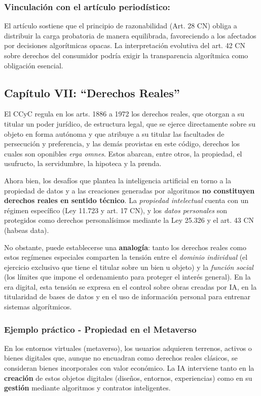 \documentclass[10pt, a4paper]{article}
\begin{document}
\subsubsection*{Vinculación con el artículo periodístico:}
El artículo sostiene que el principio de razonabilidad (Art. 28 CN) obliga a distribuir la carga probatoria de manera equilibrada, favoreciendo a los afectados por decisiones algorítmicas opacas. La interpretación evolutiva del art. 42 CN sobre derechos del consumidor podría exigir la transparencia algorítmica como obligación esencial.

\subsection*{Capítulo VII: ``Derechos Reales''}
\label{subsec:derechos_reales}

El CCyC regula en los arts. 1886 a 1972 los derechos reales, que otorgan a su titular un poder jurídico, de estructura legal, que se ejerce directamente sobre su objeto en forma autónoma y que atribuye a su titular las facultades de persecución y preferencia, y las demás provistas en este código, derechos los cuales son oponibles \textit{erga omnes}. Estos abarcan, entre otros, la propiedad, el usufructo, la servidumbre, la hipoteca y la prenda.  

Ahora bien, los desafíos que plantea la inteligencia artificial en torno a la propiedad de datos y a las creaciones generadas por algoritmos \textbf{no constituyen derechos reales en sentido técnico}. La \textit{propiedad intelectual} cuenta con un régimen específico (Ley 11.723 y art. 17 CN), y los \textit{datos personales} son protegidos como derechos personalísimos mediante la Ley 25.326 y el art. 43 CN (habeas data).  

No obstante, puede establecerse una \textbf{analogía}: tanto los derechos reales como estos regímenes especiales comparten la tensión entre el \textit{dominio individual} (el ejercicio exclusivo que tiene el titular sobre un bien u objeto) y la \textit{función social} (los límites que impone el ordenamiento para proteger el interés general). En la era digital, esta tensión se expresa en el control sobre obras creadas por IA, en la titularidad de bases de datos y en el uso de información personal para entrenar sistemas algorítmicos.  

\subsubsection*{Ejemplo práctico - Propiedad en el Metaverso}
En los entornos virtuales (metaverso), los usuarios adquieren terrenos, activos o bienes digitales que, aunque no encuadran como derechos reales clásicos, se consideran bienes incorporales con valor económico. La IA interviene tanto en la \textbf{creación} de estos objetos digitales (diseños, entornos, experiencias) como en su \textbf{gestión} mediante algoritmos y contratos inteligentes.  
\end{document}
